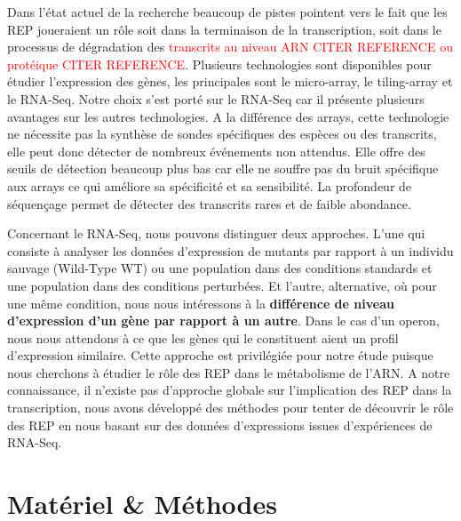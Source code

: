 \documentclass[12pt,a4paper]{report}
\begin{document}
\begin{onehalfspace}
\vspace{2.8cm}Dans l'état actuel de la recherche beaucoup de pistes pointent vers le fait que les REP joueraient un rôle soit dans la terminaison de la transcription, soit dans le processus de dégradation des \textcolor{red}{transcrits au niveau ARN CITER REFERENCE ou protéique CITER REFERENCE}. Plusieurs technologies sont disponibles pour étudier l'expression des gènes, les principales sont le micro-array, le \gls{tiling-array} et le \gls{RNA-Seq}. Notre choix s'est porté sur le RNA-Seq car il présente plusieurs avantages sur les autres technologies. A la différence des arrays, cette technologie ne nécessite pas la synthèse de sondes spécifiques des espèces ou des transcrits, elle peut donc détecter de nombreux événements non attendus. Elle offre des seuils de détection beaucoup plus bas car elle ne souffre pas du bruit spécifique aux arrays ce qui améliore sa spécificité et sa sensibilité. La profondeur de séquençage permet de détecter des transcrits rares et de faible abondance.

Concernant le RNA-Seq, nous pouvons distinguer deux approches. L'une qui consiste à analyser les données d'expression de mutants par rapport à un individu sauvage (Wild-Type WT) ou une population dans des conditions standards et une population dans des conditions perturbées. Et l'autre, alternative, où pour une même condition, nous nous intéressons à la \textbf{différence de niveau d'expression d'un gène par rapport à un autre}. Dans le cas d'un \gls{operon}, nous nous attendons à ce que les gènes qui le constituent aient un profil d'expression similaire. Cette approche est privilégiée pour notre étude puisque nous cherchons à étudier le rôle des REP dans le métabolisme de l'ARN.
A notre connaissance, il n'existe pas d'approche globale sur l'implication des REP dans la transcription, nous avons développé des méthodes pour tenter de découvrir le rôle des REP en nous basant sur des données d'expressions issues d'expériences de RNA-Seq.


\chapter*{Matériel \& Méthodes}



\end{onehalfspace}
\end{document}
